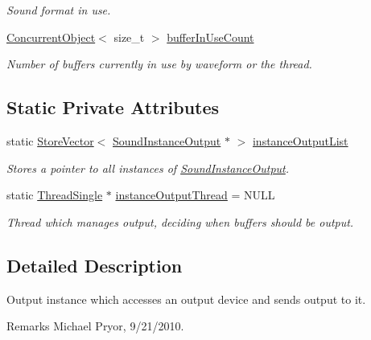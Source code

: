\begin{DoxyCompactItemize}
\begin{DoxyCompactList}\small\item\em Sound format in use. \item\end{DoxyCompactList}\item 
\hypertarget{class_sound_instance_output_a553a1bf408082e6d98f1472f60c014bf}{
\hyperlink{class_concurrent_object}{ConcurrentObject}$<$ size\_\-t $>$ \hyperlink{class_sound_instance_output_a553a1bf408082e6d98f1472f60c014bf}{bufferInUseCount}}
\label{class_sound_instance_output_a553a1bf408082e6d98f1472f60c014bf}

\begin{DoxyCompactList}\small\item\em Number of buffers currently in use by waveform or the thread. \item\end{DoxyCompactList}\end{DoxyCompactItemize}
\subsection*{Static Private Attributes}
\begin{DoxyCompactItemize}
\item 
static \hyperlink{class_store_vector}{StoreVector}$<$ \hyperlink{class_sound_instance_output}{SoundInstanceOutput} $\ast$ $>$ \hyperlink{class_sound_instance_output_a6c22559d4c8c6f04ee92cf6763a8493f}{instanceOutputList}
\begin{DoxyCompactList}\small\item\em Stores a pointer to all instances of \hyperlink{class_sound_instance_output}{SoundInstanceOutput}. \item\end{DoxyCompactList}\item 
static \hyperlink{class_thread_single}{ThreadSingle} $\ast$ \hyperlink{class_sound_instance_output_af1ad50da6639146c3b0ef782bd4737ab}{instanceOutputThread} = NULL
\begin{DoxyCompactList}\small\item\em Thread which manages output, deciding when buffers should be output. \item\end{DoxyCompactList}\end{DoxyCompactItemize}


\subsection{Detailed Description}
Output instance which accesses an output device and sends output to it. \begin{DoxyRemark}{Remarks}
Michael Pryor, 9/21/2010. 
\end{DoxyRemark}


